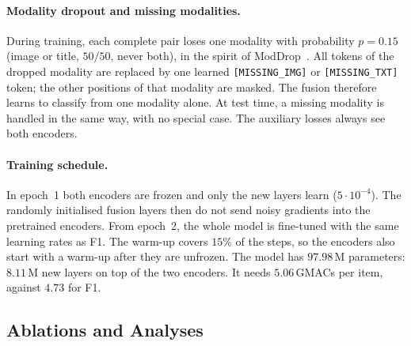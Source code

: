 \paragraph{Modality dropout and missing modalities.}
During training, each complete pair loses one modality with probability $p=0.15$ (image or title, $50/50$, never
both), in the spirit of ModDrop~\cite{neverova2016moddrop}. All tokens of the dropped modality are replaced by one
learned \texttt{[MISSING\_IMG]} or \texttt{[MISSING\_TXT]} token; the other positions of that modality are masked.
The fusion therefore learns to classify from one modality alone. At test time, a missing modality is handled in the
same way, with no special case. The auxiliary losses always see both encoders.

\paragraph{Training schedule.}
In epoch~1 both encoders are frozen and only the new layers learn ($5\cdot10^{-4}$). The randomly initialised fusion
layers then do not send noisy gradients into the pretrained encoders. From epoch~2, the whole model is fine-tuned
with the same learning rates as F1. The warm-up covers $15\%$ of the steps, so the encoders also start with a
warm-up after they are unfrozen. The model has $97.98$\,M parameters: $8.11$\,M new layers on top of the two
encoders. It needs $5.06$\,GMACs per item, against $4.73$ for F1.

\subsection{Ablations and Analyses}
\label{sec:ablations}

